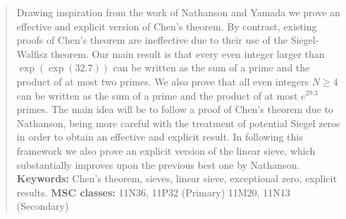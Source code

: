 \documentclass[12pt]{amsart}
\begin{document}

\begin{abstract}
Drawing inspiration from the work of Nathanson and Yamada we prove an effective and explicit version of Chen's theorem. By contrast, existing proofs of Chen's theorem are ineffective due to their use of the Siegel-Walfisz theorem. Our main result is that every even integer larger than $\exp (\exp (32.7))$ can be written as the sum of a prime and the product of at most two primes. We also prove that all even integers $N\ge 4$ can be written as the sum of a prime and the product of at most $e^{29.3}$ primes. The main idea will be to follow a proof of Chen's theorem due to Nathanson, being more careful with the treatment of potential Siegel zeros in order to obtain an effective and explicit result. In following this framework we also prove an explicit version of the linear sieve, which substantially improves upon the previous best one by Nathanson. \newline
\newline
 \noindent \textbf{Keywords:} Chen's theorem, sieves, linear sieve, exceptional zero, explicit results.\newline
\newline
 \noindent \textbf{MSC classes:} 11N36, 11P32 (Primary) 11M20, 11N13 (Secondary)  
 \end{abstract}

\begin{nouppercase}
\maketitle
\end{nouppercase}
\end{document}
